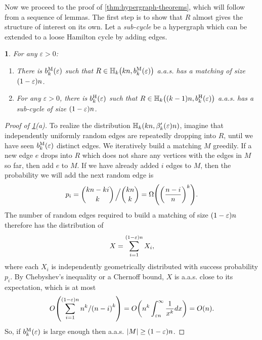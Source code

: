 \documentclass[11pt,english]{article}
\theoremstyle{plain}
\theoremstyle{definition}
\theoremstyle{definition}
\theoremstyle{plain}
\theoremstyle{plain}
\theoremstyle{plain}
\newtheorem{lem}[thm]{\protect\lemmaname}
\theoremstyle{plain}
\theoremstyle{remark}
\theoremstyle{remark}
\let\originalleft\left
\let\originalright\right
\renewcommand{\left}{\mathopen{}\mathclose\bgroup\originalleft}
\renewcommand{\right}{\aftergroup\egroup\originalright}
\providecommand{\lemmaname}{Lemma}
\begin{document}
Now we proceed to the proof of \ref{thm:hypergraph-theorems}, which
will follow from a sequence of lemmas. The first step is to show that
$R$ almost gives the structure of interest on its own. Let a\emph{
sub-cycle} be a hypergraph which can be extended to a loose Hamilton
cycle by adding edges.
\begin{lem}
\label{lem:hypergraph-almost-object}For any $\varepsilon>0$:

\begin{enumerate}[topsep=0px,label=(\alph*)]

\item{There is $b_{k}^{\mathrm{M}}\left(\varepsilon\right)$ such
that $R\in\HH_{k}\left(kn,b_{k}^{\mathrm{M}}\left(\varepsilon\right)\right)$
a.a.s. has a matching of size $\left(1-\varepsilon\right)n$.}

\item{For any $\varepsilon>0$, there is $b_{k}^{\mathrm{H}}\left(\varepsilon\right)$
such that $R\in\HH_{k}\left(\left(k-1\right)n,b_{k}^{\mathrm{H}}\left(\varepsilon\right)\right)$
a.a.s. has a sub-cycle of size $\left(1-\varepsilon\right)n$.}

\end{enumerate}\end{lem}
\begin{proof}
[Proof of \ref{lem:hypergraph-almost-object}(a)]To realize the distribution
$\HH_{k}\left(kn,\beta_{k}'\left(\varepsilon\right)n\right)$, imagine
that independently uniformly random edges are repeatedly dropping
into $R$, until we have seen $b_{k}^{\mathrm{M}}\left(\varepsilon\right)$
distinct edges. We iteratively build a matching $M$ greedily. If
a new edge $e$ drops into $R$ which does not share any vertices
with the edges in $M$ so far, then add $e$ to $M$. If we have already
added $i$ edges to $M$, then the probability we will add the next
random edge is
\[
p_{i}={kn-ki \choose k}\left.\vphantom{\sum}\right/{kn \choose k}=\Omega\left(\left(\frac{n-i}{n}\right)^{k}\right).
\]
The number of random edges required to build a matching of size $\left(1-\varepsilon\right)n$
therefore has the distribution of
\[
X=\sum_{i=1}^{\left(1-\varepsilon\right)n}X_{i},
\]
where each $X_{i}$ is independently geometrically distributed with
success probability $p_{i}$. By Chebyshev's inequality or a Chernoff
bound, $X$ is a.a.s. close to its expectation, which is at most 
\[
O\left(\sum_{i=1}^{\left(1-\varepsilon\right)n}n^{k}/\left(n-i\right)^{k}\right)=O\left(n^{k}\int_{\varepsilon n}^{\infty}\frac{1}{x^{k}}dx\right)=O\left(n\right).
\]
So, if $b_{k}^{\mathrm{M}}\left(\varepsilon\right)$ is large enough
then a.a.s. $\left|M\right|\ge\left(1-\varepsilon\right)n$.
\end{proof}
\end{document}
